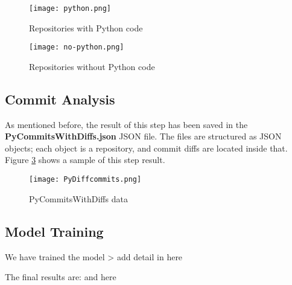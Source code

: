 \begin{figure}
    \centering
    \texttt{[image: python.png]}
    \caption{Repositories with Python code}
    \label{fig:python}
\end{figure}

\begin{figure}
    \centering
    \texttt{[image: no-python.png]}
    \caption{Repositories without Python code}
    \label{fig:no-python}
\end{figure}

\subsection{Commit Analysis}

As mentioned before, the result of this step has been saved in the \textbf{PyCommitsWithDiffs.json} JSON file. 
The files are structured as JSON objects; each object is a repository, and commit diffs are located inside that. Figure \ref{fig:py-diffcommits} shows a sample of this step result.

\begin{figure}
    \centering
    \texttt{[image: PyDiffcommits.png]}
    \caption{PyCommitsWithDiffs data}
    \label{fig:py-diffcommits}
\end{figure}

\subsection{Model Training}

We have trained the model \-\-\-> add detail in here

The final results are: and here


